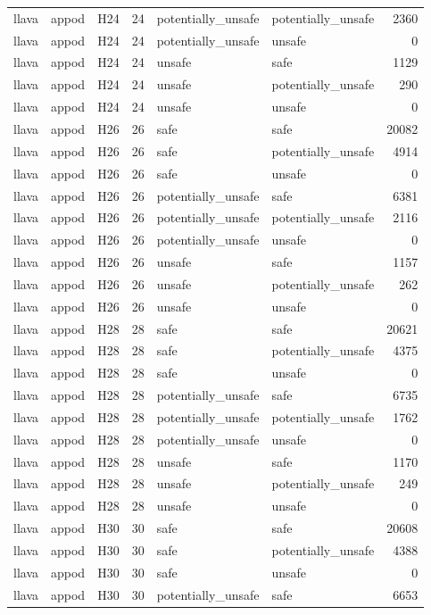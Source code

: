 \begin{table}[tbp]
\begin{tabular}{lllrllr}
llava & appod & H24 & 24 & potentially\_unsafe & potentially\_unsafe & 2360 \\
llava & appod & H24 & 24 & potentially\_unsafe & unsafe & 0 \\
llava & appod & H24 & 24 & unsafe & safe & 1129 \\
llava & appod & H24 & 24 & unsafe & potentially\_unsafe & 290 \\
llava & appod & H24 & 24 & unsafe & unsafe & 0 \\
llava & appod & H26 & 26 & safe & safe & 20082 \\
llava & appod & H26 & 26 & safe & potentially\_unsafe & 4914 \\
llava & appod & H26 & 26 & safe & unsafe & 0 \\
llava & appod & H26 & 26 & potentially\_unsafe & safe & 6381 \\
llava & appod & H26 & 26 & potentially\_unsafe & potentially\_unsafe & 2116 \\
llava & appod & H26 & 26 & potentially\_unsafe & unsafe & 0 \\
llava & appod & H26 & 26 & unsafe & safe & 1157 \\
llava & appod & H26 & 26 & unsafe & potentially\_unsafe & 262 \\
llava & appod & H26 & 26 & unsafe & unsafe & 0 \\
llava & appod & H28 & 28 & safe & safe & 20621 \\
llava & appod & H28 & 28 & safe & potentially\_unsafe & 4375 \\
llava & appod & H28 & 28 & safe & unsafe & 0 \\
llava & appod & H28 & 28 & potentially\_unsafe & safe & 6735 \\
llava & appod & H28 & 28 & potentially\_unsafe & potentially\_unsafe & 1762 \\
llava & appod & H28 & 28 & potentially\_unsafe & unsafe & 0 \\
llava & appod & H28 & 28 & unsafe & safe & 1170 \\
llava & appod & H28 & 28 & unsafe & potentially\_unsafe & 249 \\
llava & appod & H28 & 28 & unsafe & unsafe & 0 \\
llava & appod & H30 & 30 & safe & safe & 20608 \\
llava & appod & H30 & 30 & safe & potentially\_unsafe & 4388 \\
llava & appod & H30 & 30 & safe & unsafe & 0 \\
llava & appod & H30 & 30 & potentially\_unsafe & safe & 6653 \\

\end{tabular}
\end{table}
